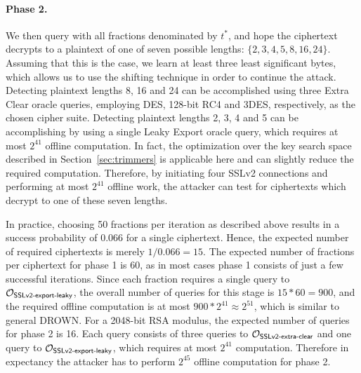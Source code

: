 \paragraph{Phase 2.}
We then query with all fractions
denominated by $t^*$, and hope the ciphertext decrypts to a plaintext of
one of seven possible lengths: $\{2, 3, 4, 5, 8, 16, 24\}$.
Assuming that this is the case, we learn at least three least significant bytes,
which allows us to use the shifting technique in order to continue the attack.
Detecting plaintext lengths 8, 16 and 24 can be accomplished using three Extra Clear oracle
queries, employing DES, 128-bit RC4 and 3DES, respectively, as the chosen cipher suite.
Detecting plaintext lengths 2, 3, 4 and 5 can be accomplishing by using a single
Leaky Export oracle query, which requires at most $2^{41}$ offline computation.
In fact, the optimization over the key search space described in
Section~\ref{sec:trimmers} is applicable here and can slightly reduce the required computation.
Therefore, by initiating four SSLv2 connections and performing at most $2^{41}$ offline
work, the attacker can test for ciphertexts which decrypt to one of these seven lengths.

In practice, choosing 50 fractions per iteration as described above
results in a success probability of 0.066 for a single ciphertext.
Hence, the expected number of required ciphertexts is merely $1/0.066 = 15$.
The expected number of fractions per ciphertext for phase 1 is 60, as in most cases phase 1
consists of just a few successful iterations.
Since each fraction requires a single query to $\mathcal{O}_\textsf{SSLv2-export-leaky}$,
the overall number of queries for this stage is
$15 * 60 = 900$, and the required offline computation is at most
$900 * 2^{41} \approx 2^{51}$, which is similar to general DROWN\@.
For a 2048-bit RSA modulus, the expected number of queries for phase 2 is 16.
Each query consists of three queries to $\mathcal{O}_\textsf{SSLv2-extra-clear}$ and one query
to $\mathcal{O}_\textsf{SSLv2-export-leaky}$, which requires at most $2^{41}$ computation.
Therefore in expectancy the attacker has to perform $2^{45}$ offline computation for phase 2.

